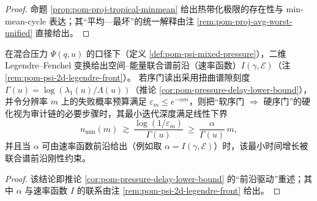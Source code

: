 \begin{proof}
命题 \ref{prop:pom-proj-tropical-minmean} 给出热带化极限的存在性与 min-mean-cycle 表达；其“平均—最坏”的统一解释由注 \ref{rem:pom-proj-avg-worst-unified} 直接给出。
\end{proof}

\begin{theorem}\label{thm:xi-hardening-time-frontier-rigidity}
在混合压力 \(\Psi(q,u)\) 的口径下（定义 \ref{def:pom-psi-mixed-pressure}），二维 Legendre--Fenchel 变换给出空间--能量联合谱前沿（速率函数）\(I(\gamma,\mathcal{E})\)（注 \ref{rem:pom-psi-2d-legendre-front}）。
若序门读出采用扭曲谱隙刻度 \(\Gamma(u)=\log(\lambda_1(u)/\Lambda(u))\)（推论 \ref{cor:pom-pressure-delay-lower-bound}），并令分辨率 \(m\) 上的失败概率预算满足 \(\varepsilon_m\le e^{-\alpha m}\)，则把“软序门 \(\Rightarrow\) 硬序门”的硬化视为审计链的必要步骤时，其最小迭代深度满足线性下界
\[
n_{\min}(m)\ \gtrsim\ \frac{\log(1/\varepsilon_m)}{\Gamma(u)}\ \ge\ \frac{\alpha}{\Gamma(u)}\,m,
\]
并且当 \(\alpha\) 可由速率函数前沿给出（例如取 \(\alpha=I(\gamma,\mathcal{E})\)）时，该最小时间增长被联合谱前沿刚性约束。
\end{theorem}

\begin{proof}
该结论即推论 \ref{cor:pom-pressure-delay-lower-bound} 的“前沿驱动”重述；其中 \(\alpha\) 与速率函数 \(I\) 的联系由注 \ref{rem:pom-psi-2d-legendre-front} 给出。
\end{proof}

